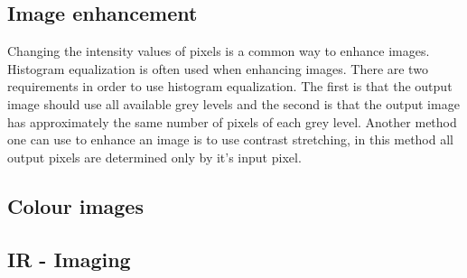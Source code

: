 \subsection{Image enhancement}
Changing the intensity values of pixels is a common way to enhance images. Histogram equalization is often used when enhancing images. There are two requirements in order to use histogram equalization. The first is that the output image should use all available grey levels and the second is that the output image has approximately the same number of pixels of each grey level. Another method one can use to enhance an image is to use contrast stretching, in this method all output pixels are determined only by it's input pixel.


\subsection{Colour images}


\subsection{IR - Imaging}